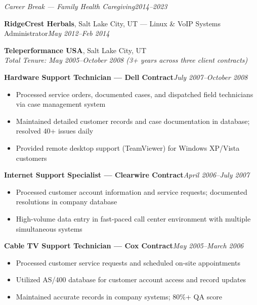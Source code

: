\documentclass[9pt,letterpaper]{extarticle}
\begin{document}
\vspace{3pt}
\noindent\textit{Career Break --- Family Health Caregiving}\hfill\textit{2014--2023}

\vspace{3pt}
\noindent\textbf{RidgeCrest Herbals}, Salt Lake City, UT --- Linux \& VoIP Systems Administrator\hfill\textit{May 2012--Feb 2014}

\vspace{5pt}
\noindent\textbf{Teleperformance USA}, Salt Lake City, UT\\
\textit{Total Tenure: May 2005--October 2008 (3+ years across three client contracts)}

\smallskip
{}
\noindent\textbf{Hardware Support Technician --- Dell Contract}\hfill\textit{July 2007--October 2008}
\begin{itemize}
  \item Processed service orders, documented cases, and dispatched field technicians via case management system
  \item Maintained detailed customer records and case documentation in database; resolved 40+ issues daily
  \item Provided remote desktop support (TeamViewer) for Windows XP/Vista customers
\end{itemize}

\noindent\textbf{Internet Support Specialist --- Clearwire Contract}\hfill\textit{April 2006--July 2007}
\begin{itemize}
  \item Processed customer account information and service requests; documented resolutions in company database
  \item High-volume data entry in fast-paced call center environment with multiple simultaneous systems
\end{itemize}

\noindent\textbf{Cable TV Support Technician --- Cox Contract}\hfill\textit{May 2005--March 2006}
\begin{itemize}
  \item Processed customer service requests and scheduled on-site appointments
  \item Utilized AS/400 database for customer account access and record updates
  \item Maintained accurate records in company systems; 80\%+ QA score
\end{itemize}
\end{document}
